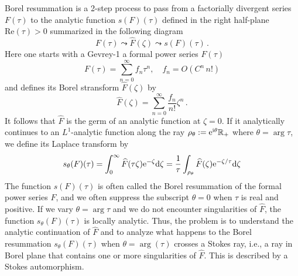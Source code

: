 \documentclass[12pt,reqno]{amsart}
\theoremstyle{definition}
\def\BR{\mathbbm R}
\def\th{\theta}
\def\ri{\mathrm{i}}
\def\rd{\mathrm{d}}
\def\re{{\rm e}}
\def\ri{{\rm i}}
\def\rd{{\rm d}}
\def\Re{\mathrm{Re}}
\def\IR{\mathbb{R}}
\newcommand{\wh}[1]{\widehat{#1}}
\begin{document}
Borel resummation is a 2-step process to pass from a factorially
divergent series $F(\tau)$ to the analytic function $s(F)(\tau)$
defined in the right half-plane $\Re(\tau)>0$ summarized in the
following diagram
\begin{equation}
  \label{borel-sum}
  F(\tau) \leadsto %
  \wh{F}(\zeta) \leadsto %
  s(F)(\tau) \,.
\end{equation}
Here one starts with a Gevrey-1 a formal power series $F(\tau)$
\begin{equation}
  F(\tau) = \sum_{n=0}^\infty f_n \tau^{n} ,\quad f_n = O(C^n \, n!)
\end{equation}
and defines its Borel stransform $\wh{F}(\zeta)$ by
\begin{equation}
  \wh{F}(\zeta) = \sum_{n=0}^\infty \frac{f_n}{n!} \zeta^n \,.
\end{equation}
It follows that $\wh{F}$ is the germ of an analytic function at
$\zeta=0$. If it analytically continues to an $L^1$-analytic function
along the ray $\rho_\theta:=\re^{\ri\theta}\IR_+$ where
$\theta = \arg \tau$, we define its Laplace transform by 
\begin{equation}
  s_{\theta}(F)(\tau)=
  \int_0^\infty \wh{F}(\tau\zeta) \re^{-\zeta} \rd \zeta=
  \frac{1}{\tau} \int_{\rho_\theta}
  \wh{F}(\zeta)\re^{-\zeta/\tau} \rd \zeta
  \label{eq:brlsum}
\end{equation}
The function $s(F)(\tau)$ is often called the Borel resummation of the
formal power series $F$, and we often suppress the subscript $\theta=0$
when $\tau$ is real and positive.
If we vary $\theta = \arg \tau$ and we do not encounter singularities
of $\wh{F}$, the function $s_\th(F)(\tau)$ is locally analytic. Thus,
the problem is to understand the analytic continuation of $\wh{F}$ and
to analyze what happens to the Borel resummation $s_\theta(F)(\tau)$
when $\theta =\arg(\tau)$ crosses a Stokes ray, i.e., a ray in Borel
plane that contains one or more singularities of $\wh{F}$. This is
described by a Stokes automorphism.
\end{document}
